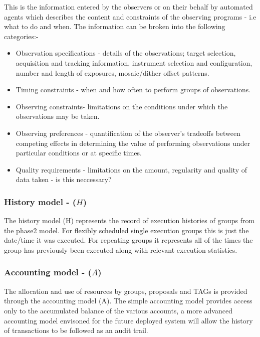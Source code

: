 This is the information entered by the observers or on their behalf by automated agents which describes the content and constraints of the observing programs - i.e what to do and when. The information can be broken into the following categories:-

\begin{itemize}
\item Observation specifications - details of the observations; target selection, acquisition and tracking information, instrument selection and configuration, number and length of exposures, mosaic/dither offset patterns.
\item Timing constraints - when and how often to perform groups of observations.
\item Observing constraints- limitations on the conditions under which the observations may be taken.
\item Observing preferences - quantification of the observer's tradeoffs between competing effects in determining the value of performing observations under particular conditions or at specific times.
\item Quality requirements - limitations on the amount, regularity and quality of data taken - is this neccessary?
\end{itemize}



\subsubsection{History model - ($H$)}
The history model (H) represents the record of execution histories of groups from the phase2 model. For flexibly scheduled single execution groups this is just the date/time it was executed. For repeating groups it represents all of the times the group has previously been executed along with relevant execution statistics. 

\subsubsection{Accounting model - ($A$)}
The allocation and use of resources by groups, proposals and TAGs is provided through the accounting model (A). The simple accounting model provides access only to the accumulated balance of the various accounts, a more advanced accounting model envisoned for the future deployed system will allow the history of transactions to be followed as an audit trail.

